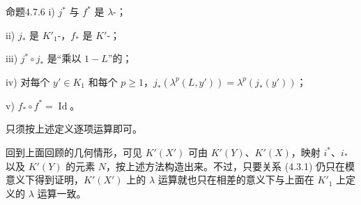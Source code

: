 \begin{SGAresult}{命题}{4.7.6}
 i) $j^*$ 与 $f^*$ 是 $\lambda$-；

 ii) $j_*$ 是 $K'_1$-，$f_*$ 是 $K'$-；

 iii) $j^*\circ j_*$ 是“乘以 $1-L$”的；

 iv) 对每个 $y'\in K_1$ 和每个 $p\geq1$，$j_*(\lambda^p(L,y'))=\lambda^p(j_*(y'))$；

 v) $f_*\circ f^*=\operatorname{Id}$。
\end{SGAresult}
只须按上述定义逐项运算即可。

回到上面回顾的几何情形，可见 $K'(X')$ 可由 $K'(Y)$、$K'(X)$，映射 $i^*$、$i_*$ 以及 $K'(Y)$ 的元素 $N$，按上述方法构造出来。不过，只要关系 (4.3.1) 仍只在模意义下得到证明，$K'(X')$ 上的 $\lambda$ 运算就也只在相差的意义下与上面在 $K'_1$ 上定义的 $\lambda$ 运算一致。

